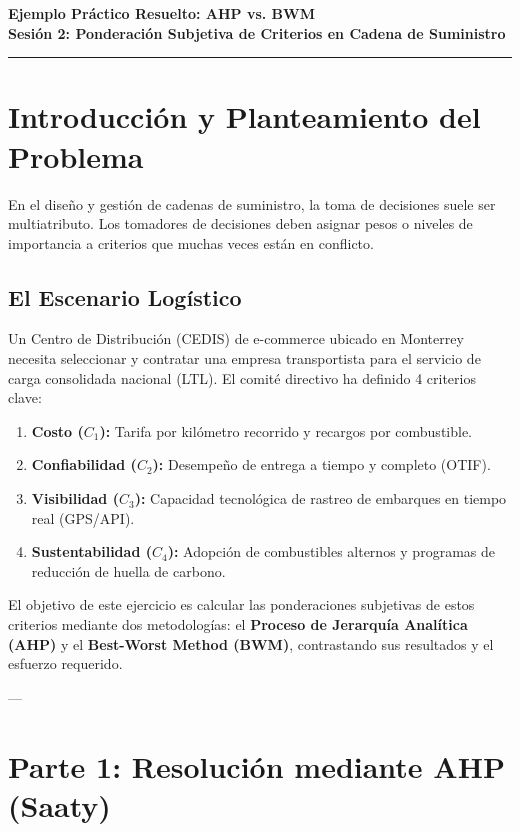 \documentclass[11pt, letterpaper]{article}
\begin{document}
\begin{center}
    {\LARGE\bfseries\color{UANLblue} Ejemplo Práctico Resuelto: AHP vs. BWM} \\[0.3cm]
    {\large\bfseries\color{FIMEgreen} Sesión 2: Ponderación Subjetiva de Criterios en Cadena de Suministro} \\[0.2cm]
    \rule{\linewidth}{1.5pt}
\end{center}

\section{Introducción y Planteamiento del Problema}

En el diseño y gestión de cadenas de suministro, la toma de decisiones suele ser multiatributo. Los tomadores de decisiones deben asignar pesos o niveles de importancia a criterios que muchas veces están en conflicto.

\subsection{El Escenario Logístico}
Un Centro de Distribución (CEDIS) de e-commerce ubicado en Monterrey necesita seleccionar y contratar una empresa transportista para el servicio de carga consolidada nacional (LTL). El comité directivo ha definido 4 criterios clave:
\begin{enumerate}
    \item \textbf{Costo ($C_1$):} Tarifa por kilómetro recorrido y recargos por combustible.
    \item \textbf{Confiabilidad ($C_2$):} Desempeño de entrega a tiempo y completo (OTIF).
    \item \textbf{Visibilidad ($C_3$):} Capacidad tecnológica de rastreo de embarques en tiempo real (GPS/API).
    \item \textbf{Sustentabilidad ($C_4$):} Adopción de combustibles alternos y programas de reducción de huella de carbono.
\end{enumerate}

El objetivo de este ejercicio es calcular las ponderaciones subjetivas de estos criterios mediante dos metodologías: el \textbf{Proceso de Jerarquía Analítica (AHP)} y el \textbf{Best-Worst Method (BWM)}, contrastando sus resultados y el esfuerzo requerido.

---

\section{Parte 1: Resolución mediante AHP (Saaty)}
\end{document}
